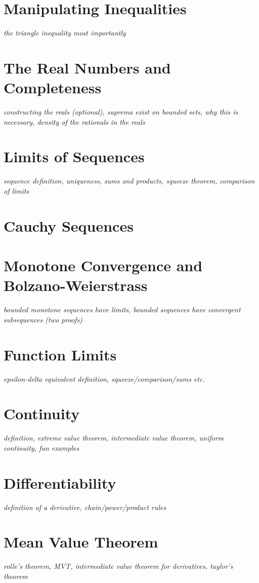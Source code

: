 \documentclass[../../../main.tex]{subfiles}
\begin{document}

\section{Manipulating Inequalities}
\textit{the triangle inequality most importantly}
\section{The Real Numbers and Completeness}
\textit{constructing the reals (optional), suprema exist on bounded sets, why this is necessary, density of the rationals in the reals}
\section{Limits of Sequences}
\textit{sequence definition, uniqueness, sums and products, squeeze theorem, comparison of limits}
\section{Cauchy Sequences}
\section{Monotone Convergence and Bolzano-Weierstrass}
\textit{bounded monotone sequences have limits, bounded sequences have convergent subsequences (two proofs)}
\section{Function Limits}
\textit{epsilon-delta equivalent definition, squeeze/comparison/sums etc.}
\section{Continuity}
\textit{definition, extreme value theorem, intermediate value theorem, uniform continuity, fun examples}
\section{Differentiability}
\textit{definition of a derivative, chain/power/product rules}
\section{Mean Value Theorem}
\textit{rolle's theorem, MVT, intermediate value theorem for derivatives, taylor's theorem}
\end{document}
